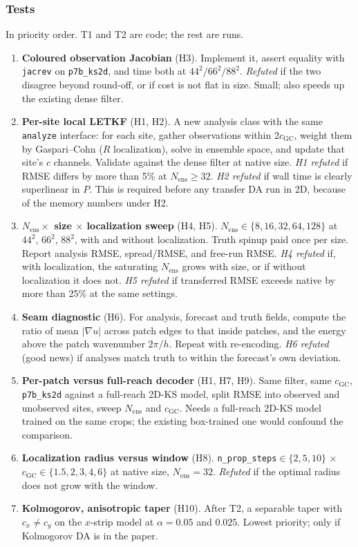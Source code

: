 \documentclass[11pt]{article}
\begin{document}
\subsubsection*{Tests}
In priority order. T1 and T2 are code; the rest are runs.
\begin{enumerate}[leftmargin=*,label=T\arabic*.]
\item \textbf{Coloured observation Jacobian} (H3). Implement it, assert
  equality with \texttt{jacrev} on \texttt{p7b\_ks2d}, and time both at
  $44^2/66^2/88^2$. \emph{Refuted} if the two disagree beyond round-off,
  or if cost is not flat in size. Small; also speeds up the existing
  dense filter.
\item \textbf{Per-site local LETKF} (H1, H2). A new analysis class with
  the same \texttt{analyze} interface: for each site, gather observations
  within $2c_{\mathrm{GC}}$, weight them by Gaspari--Cohn ($R$
  localization), solve in ensemble space, and update that site's $c$
  channels. Validate against the dense filter at native size. \emph{H1
  refuted} if RMSE differs by more than 5\% at $N_{\mathrm{ens}}{\ge}32$.
  \emph{H2 refuted} if wall time is clearly superlinear in $P$. This is
  required before any transfer DA run in 2D, because of the memory
  numbers under H2.
\item \textbf{$N_{\mathrm{ens}}\times$ size $\times$ localization sweep}
  (H4, H5). $N_{\mathrm{ens}}\in\{8,16,32,64,128\}$ at $44^2$, $66^2$,
  $88^2$, with and without localization. Truth spinup paid once per
  size. Report analysis RMSE, spread/RMSE, and free-run RMSE. \emph{H4
  refuted} if, with localization, the saturating $N_{\mathrm{ens}}$
  grows with size, or if without localization it does not. \emph{H5
  refuted} if transferred RMSE exceeds native by more than 25\% at the
  same settings.
\item \textbf{Seam diagnostic} (H6). For analysis, forecast and truth
  fields, compute the ratio of mean $|\nabla u|$ across patch edges to
  that inside patches, and the energy above the patch wavenumber
  $2\pi/h$. Repeat with re-encoding. \emph{H6 refuted} (good news) if
  analyses match truth to within the forecast's own deviation.
\item \textbf{Per-patch versus full-reach decoder} (H1, H7, H9). Same
  filter, same $c_{\mathrm{GC}}$, \texttt{p7b\_ks2d} against a full-reach
  2D-KS model, split RMSE into observed and unobserved sites, sweep
  $N_{\mathrm{ens}}$ and $c_{\mathrm{GC}}$. Needs a full-reach 2D-KS
  model trained on the same crops; the existing box-trained one would
  confound the comparison.
\item \textbf{Localization radius versus window} (H8).
  \texttt{n\_prop\_steps}$\in\{2,5,10\}$ $\times$
  $c_{\mathrm{GC}}\in\{1.5,2,3,4,6\}$ at native size, $N_{\mathrm{ens}}{=}32$.
  \emph{Refuted} if the optimal radius does not grow with the window.
\item \textbf{Kolmogorov, anisotropic taper} (H10). After T2, a
  separable taper with $c_x\ne c_y$ on the $x$-strip model at
  $\alpha{=}0.05$ and $0.025$. Lowest priority; only if Kolmogorov DA is
  in the paper.
\end{enumerate}
\end{document}
